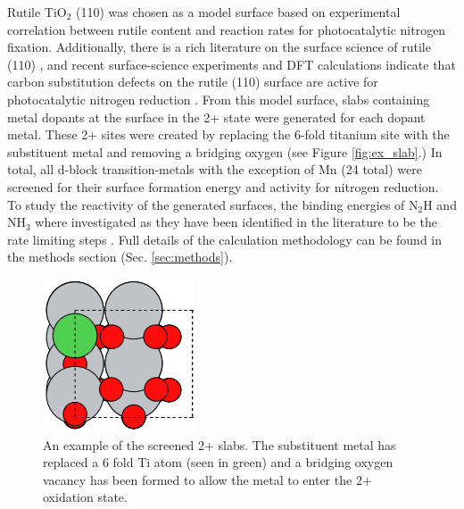 Rutile TiO$_2$ (110) was chosen as a model surface based on experimental correlation between rutile content and reaction rates for photocatalytic nitrogen fixation\cite{Schrauzer_1977}. Additionally, there is a rich literature on the surface science of rutile (110) \cite{Diebold2003,Yates_1991,Lu1994,Walle2009}, and recent surface-science experiments and DFT calculations indicate that carbon substitution defects on the rutile (110) surface are active for photocatalytic nitrogen reduction \cite{Comer_2018b}. From this model surface, slabs containing metal dopants at the surface in the 2+ state were generated for each dopant metal. These 2+ sites were created by replacing the 6-fold titanium site with the substituent metal and removing a bridging oxygen (see Figure \ref{fig:ex_slab}.) 
In total, all d-block transition-metals with the exception of Mn (24 total) were screened for their surface formation energy and activity for nitrogen reduction.  To study the reactivity of the generated surfaces, the binding energies of N$_2$H and NH$_3$ where investigated as they have been identified in the literature to be the rate limiting steps \cite{Hoskuldsson_2017, Montoya_2015, Comer_2018,}. Full details of the calculation methodology can be found in the methods section (Sec. \ref{sec:methods}).


\begin{figure}
    \centering
    \includegraphics[width=0.5\linewidth]{Images/ex_2+_slab.png}
    \caption{An example of the screened 2+ slabs. The substituent metal has replaced a 6 fold Ti atom (seen in green) and a bridging oxygen vacancy has been formed to allow the metal to enter the 2+ oxidation state.}
    \label{fig:2+_ex_slab}
\end{figure}

